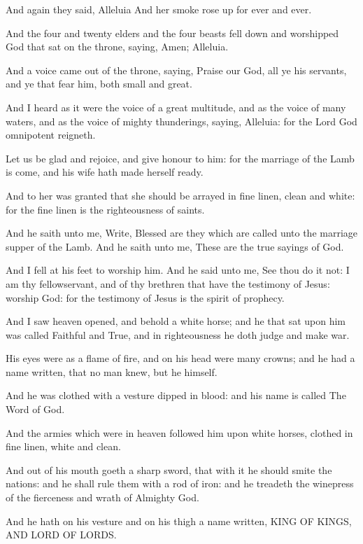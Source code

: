 \verse And again they said, Alleluia And her smoke rose up for ever and ever.

\verse And the four and twenty elders and the four beasts fell down and worshipped God that sat on the throne, saying, Amen; Alleluia.

\verse And a voice came out of the throne, saying, Praise our God, all ye his servants, and ye that fear him, both small and great.

\verse And I heard as it were the voice of a great multitude, and as the voice of many waters, and as the voice of mighty thunderings, saying, Alleluia: for the Lord God omnipotent reigneth.

\verse Let us be glad and rejoice, and give honour to him: for the marriage of the Lamb is come, and his wife hath made herself ready.

\verse And to her was granted that she should be arrayed in fine linen, clean and white: for the fine linen is the righteousness of saints.

\verse And he saith unto me, Write, Blessed are they which are called unto the marriage supper of the Lamb. And he saith unto me, These are the true sayings of God.

\verse And I fell at his feet to worship him. And he said unto me, See thou do it not: I am thy fellowservant, and of thy brethren that have the testimony of Jesus: worship God: for the testimony of Jesus is the spirit of prophecy.

\verse And I saw heaven opened, and behold a white horse; and he that sat upon him was called Faithful and True, and in righteousness he doth judge and make war.

\verse His eyes were as a flame of fire, and on his head were many crowns; and he had a name written, that no man knew, but he himself.

\verse And he was clothed with a vesture dipped in blood: and his name is called The Word of God.

\verse And the armies which were in heaven followed him upon white horses, clothed in fine linen, white and clean.

\verse And out of his mouth goeth a sharp sword, that with it he should smite the nations: and he shall rule them with a rod of iron: and he treadeth the winepress of the fierceness and wrath of Almighty God.

\verse And he hath on his vesture and on his thigh a name written, KING OF KINGS, AND LORD OF LORDS.

